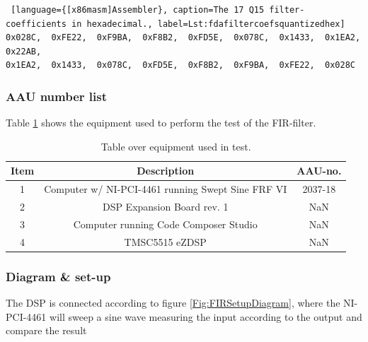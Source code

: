 \begin{lstlisting} [language={[x86masm]Assembler}, caption=The 17 Q15 filter-coefficients in hexadecimal., label=Lst:fdafiltercoefsquantizedhex]
0x028C,  0xFE22,  0xF9BA,  0xF8B2,  0xFD5E,  0x078C,  0x1433,  0x1EA2,  0x22AB,  
0x1EA2,  0x1433,  0x078C,  0xFD5E,  0xF8B2,  0xF9BA,  0xFE22,  0x028C
\end{lstlisting}



\subsubsection{AAU number list}
Table \ref{tab:UsedEquipmentListningFIRTest} shows the equipment used to perform the test of the FIR-filter.
\begin{table}[H]
	\centering
	\begin{tabular}{ c c c } \toprule
	{Item}	& {Description} 								& {AAU-no}. 	\\ \bottomrule 
	1	&	Computer w/ NI-PCI-4461 running Swept Sine FRF VI	& 2037-18			\\
	2	&	DSP Expansion Board rev. 1 						& NaN			\\
	3	&	Computer running Code Composer Studio			& NaN		\\
	4	&	TMSC5515 eZDSP 									& NaN			\\
	\bottomrule
	\end{tabular}
	\caption{Table over equipment used in test.}
	\label{tab:UsedEquipmentListningFIRTest}
\end{table}

\subsubsection{Diagram \& set-up}

The DSP is connected according to figure \ref{Fig:FIRSetupDiagram}, where the NI-PCI-4461 will sweep a sine wave measuring the input according to the output and compare the result

